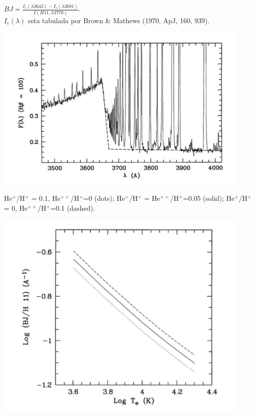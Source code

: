 \begin{minipage}[t]{13cm}
$BJ = \frac{I_c(\lambda3643)-I_c(\lambda3681)}{I(H11,\lambda3770)}.$ \\
$I_c(\lambda)$ esta tabulada por Brown \& Mathews (1970, ApJ, 160,
939).

\begin{center}
  \includegraphics[width=12.5cm,height=!]{bj_liu.jpg} \end{center}
\end{minipage}
\hfill
\begin{minipage}[t]{13cm}
He$^+$/H$^+$ = 0.1, He$^{++}$/H$^+$=0 (dots);
He$^+$/H$^+$ = He$^{++}$/H$^+$=0.05   (solid);
He$^+$/H$^+$ = 0, He$^{++}$/H$^+$=0.1   (dashed).
  \begin{center}
    \includegraphics[width=12.5cm,height=!]{BJ_T.jpg}
  \end{center}
\end{minipage}


